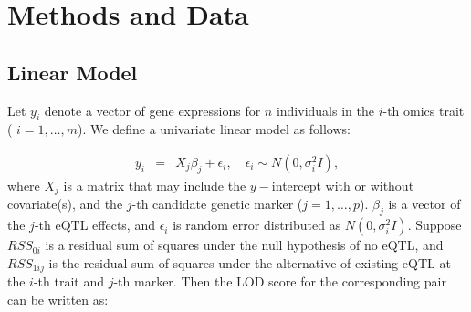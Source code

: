 \documentclass[9pt,twocolumn,twoside,lineno]{gsag3jnl}
\begin{document}
\section{Methods and Data}
\label{sec:methods:Data}





\subsection{Linear Model} 
 Let $y_i$ denote a vector of gene expressions for $n$
individuals in the $i$-th omics trait ( $i=1,\ldots,m$).  We
define a univariate linear model as follows:

\begin{eqnarray*}
	y_i &=& X_j \beta_j+ \epsilon_i,
	\quad \epsilon_i \sim N(0,\sigma_i^2I),
\end{eqnarray*}
where ${X}_j$ is a matrix that may include the $y-$intercept with
or without covariate(s), and the $j$-th candidate genetic marker
($j=1,\ldots,p$).  ${\beta}_j$ is a vector of the $j$-th eQTL
effects, and ${\epsilon}_i$ is random error distributed as $N(0,\sigma_i^2I)$.  Suppose $RSS_{0i}$
is a residual sum of squares under the null hypothesis of no eQTL, and $RSS_{1ij}$ is the residual sum of squares under the
alternative of existing eQTL at the $i$-th trait and $j$-th marker.  Then the LOD
score for the corresponding pair can be written as:
\end{document}
